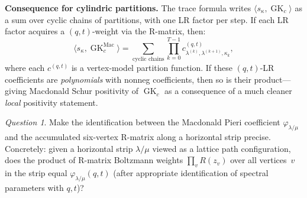 \documentclass[11pt]{article}
\theoremstyle{plain}
\theoremstyle{definition}
\theoremstyle{remark}
\newtheorem{question}[theorem]{Question}
\newcommand{\GK}{\operatorname{GK}}
\begin{document}
\medskip\noindent\textbf{Consequence for cylindric partitions.}
The trace formula writes
$\langle s_\kappa, \GK_c \rangle$ as a sum over cyclic
chains of partitions, with one LR factor per step.
If each LR factor acquires a $(q,t)$-weight via the
R-matrix, then:
\[
  \langle s_\kappa, \GK_c^{\mathrm{Mac}} \rangle
  = \sum_{\text{cyclic chains}}
  \prod_{k=0}^{T-1}
  c^{(q,t)}_{\lambda^{(k)}, \lambda^{(k+1)}, \kappa_k},
\]
where each $c^{(q,t)}$ is a vertex-model partition function.
If these $(q,t)$-LR coefficients are \emph{polynomials} with
nonneg coefficients, then so is their product---giving
Macdonald Schur positivity of $\GK_c$ as a consequence of
a much cleaner \emph{local} positivity statement.

\begin{question}\label{q:pieri-rmatrix}
Make the identification between the Macdonald Pieri
coefficient $\varphi_{\lambda/\mu}$ and the accumulated
six-vertex R-matrix along a horizontal strip precise.
Concretely: given a horizontal strip $\lambda/\mu$ viewed
as a lattice path configuration, does the product of
R-matrix Boltzmann weights $\prod_v R(z_v)$ over all
vertices~$v$ in the strip equal $\varphi_{\lambda/\mu}(q,t)$
(after appropriate identification of spectral parameters
with $q,t$)?
\end{question}
\end{document}
